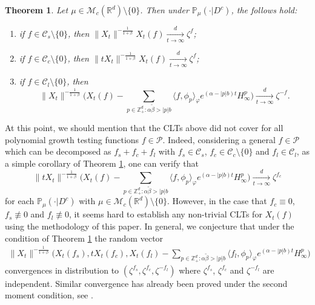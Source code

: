 \documentclass[12pt,a4paper]{amsart}
\theoremstyle{plain}
\newtheorem{thm}{Theorem}[section]
\theoremstyle{definition}
\numberwithin{equation}{section}
\begin{document}
\begin{thm}
  \label{thm:M}
  Let $\mu\in \mathcal M_c(\mathbb R^d)\setminus \{0\}$.
  Then under $\mathbb{P}_{\mu}(\cdot|D^c)$, the follows hold:
\begin{enumerate}
\item
  \label{thm:M:1}
  if $f\in \mathcal C_s\setminus\{0\}$, then $\|X_t\|^{- \frac{1}{1+\beta}} X_t(f)  \xrightarrow[t\to \infty]{d} \zeta^f$;
\item
  \label{thm:M:2}
  if $f\in \mathcal C_c\setminus\{0\}$, then $ \|t X_t\|^{-\frac{1}{1+\beta}} X_t(f) \xrightarrow[t\to \infty]{d} \zeta^f$; 
\item
  \label{thm:M:3}
  if $f\in \mathcal C_l\setminus\{0\}$, then
  \[
    \|X_t\|^{-\frac{1}{1+\beta}} \Big( X_t(f) - \sum_{p\in \mathbb Z^d_+:\alpha \tilde \beta>|p|b}\langle f,\phi_p\rangle_\varphi e^{(\alpha-|p|b)t}H^p_{\infty}\Big)
    \xrightarrow[t\to \infty]{d}
    \zeta^{-f}.
  \]
\end{enumerate}
\end{thm}

At this point, we should mention that the CLTs above did not cover for all polynomial growth testing functions $f\in \mathcal P$.
Indeed, considering a general $f \in \mathcal P$ which can be decomposed as $f_s + f_c + f_l$ with $f_s \in \mathcal C_s$, $f_c \in \mathcal C_c\setminus\{0\}$ and $f_l \in \mathcal C_l$, as a simple corollary of Theorem \ref{thm:M}, one can verify that 
\[
  \|tX_t\|^{-\frac{1}{1+\beta}} \Big( X_t(f) - \sum_{p\in \mathbb Z^d_+:\alpha \tilde \beta>|p|b}\langle f,\phi_p\rangle_\varphi e^{(\alpha-|p|b)t}H^p_{\infty}\Big)
  \xrightarrow[t\to \infty]{d}
  \zeta^{f_c}
\]
for each $\mathbb P_\mu(\cdot | D^c)$ with $\mu \in \mathcal M_c(\mathbb R^d)\setminus \{0\}$.
However, in the case that $f_c\equiv 0$, $f_s\not \equiv 0$ and $f_l\not \equiv 0$, it seems hard to establish any non-trivial CLTs for $X_t(f)$ using the methodology of this paper.  
In general, we conjecture that under the condition of Theorem \ref{thm:M} the random vector
\begin{align}
  \|X_t\|^{- \frac{1}{1+\beta}} \Big( X_t(f_s) ,t X_t(f_c),  X_t(f_l) - \sum_{p\in \mathbb Z^d_+:\alpha \tilde \beta>|p|b}\langle f_l,\phi_p\rangle_\varphi e^{(\alpha-|p|b)t}H^p_{\infty} \Big)
\end{align}
convergences in distribution to $(\zeta^{f_s},\zeta^{f_c}, \zeta^{-f_l})$ where $\zeta^{f_s}$, $\zeta^{f_c}$ and $\zeta^{-f_l}$ are independent.
Similar convergence has already been proved under the second moment condition, see \cite{RenSongZhang2015Central}.
\end{document}
